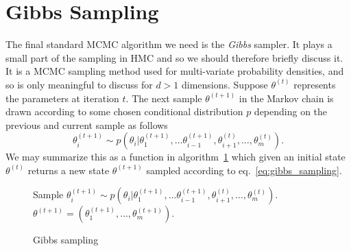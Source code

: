 \section{Gibbs Sampling}
The final standard MCMC algorithm we need is the \textit{Gibbs} sampler. It plays a small
part of the sampling in HMC and so we should therefore briefly discuss it.
It is a MCMC sampling method used for multi-variate probability densities, and
so is only meaningful to discuss for $d > 1$ dimensions.
Suppose $\theta^{(t)}$ represents the parameters at iteration $t$. 
The next sample $\theta^{(t+1)}$ in the Markov chain is drawn according to some chosen
conditional distribution $p$ depending on the previous and current sample as follows
\begin{equation}\label{eq:gibbs_sampling}
  \theta_i^{(t+1)} \sim p(\theta_i|\theta_{1}^{(t+1)}, \ldots \theta_{i-1}^{(t+1)}, \theta_{i+1}^{(t)}, \ldots, \theta_{m}^{(t)}).
\end{equation}
We may summarize this as a function in algorithm~\ref{algo:gibbs} which 
given an initial state $\theta^{(t)}$ returns a new state $\theta^{(t+1)}$
sampled according to eq.~\eqref{eq:gibbs_sampling}.
\begin{figure}[H]
  \begin{algorithm}[H]
    \caption{Gibbs sampling}\label{algo:gibbs}
    \begin{algorithmic}
          \State Sample $\theta_i^{(t+1)} \sim p(\theta_i|\theta_{1}^{(t+1)}, \ldots \theta_{i-1}^{(t+1)}, \theta_{i+1}^{(t)}, \ldots, \theta_{m}^{(t)}).$
        \EndFor \\
        \Return $\theta^{(t+1)} = \left(\theta_1^{(t+1)}, \ldots, \theta_m^{(t+1)}\right)$.
      \EndFunction
    \end{algorithmic}
  \end{algorithm}
\end{figure}


